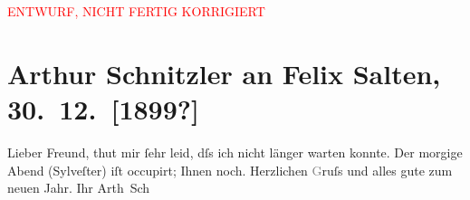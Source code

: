
\begin{center}
            \textcolor{red}{ENTWURF, NICHT FERTIG KORRIGIERT}
                      \end{center}
            
         
         \renewcommand{\erwaehntePersonen}{Personen: Felix Salten}
         \renewcommand{\erwaehnteOrte}{Orte: Wien}
         \renewcommand{\erwaehnteWerke}{}
               \section[Arthur Schnitzler an Felix Salten, 30. 12. {[}1899?{]}]{ Arthur Schnitzler an Felix Salten, 30. 12. {[}1899?{]}}\nopagebreak{}\rehead{ }\begin{ledgroupsized}[t]{13cm}\normalsize\beginnumbering \toendnotes[C]{\smallbreak\pagebreak[2]} 
\toendnotes[C]{\smallbreak}\pstart
           \noindent{}{\pb}Lieber Freund, thut mir ſehr leid, dſs ich nicht länger warten
               konnte. Der morgige Abend (Sylveſter) iſt occupirt; \label{K_L03032-1v}\label{K_L03032-1h} Ihnen noch. Herzlichen
                  \textcolor{gray}{G}ruſs und alles gute zum neuen Jahr. Ihr \spacefill\mbox{Arth
                  Sch}\pend
           
         
         \endnumbering{}\end{ledgroupsized}\begin{anhang}\end{anhang}\newcommand{\dateiname}{L03032}\newcommand{\titel}{Arthur Schnitzler an Felix Salten, 30. 12. [1899?]}\newcommand{\editorInnen}{Martin Anton Müller und Laura Untner}
      